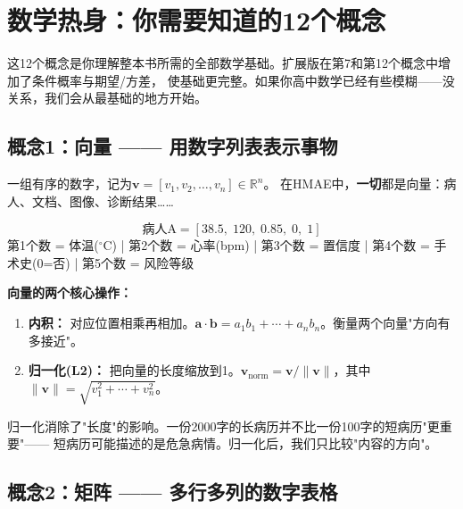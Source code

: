 \documentclass[11pt,a4paper]{ctexart}
\begin{document}
\section{数学热身：你需要知道的12个概念}

\begin{warnbox}[别怕！每个公式旁边都有中文解释]
这12个概念是你理解整本书所需的全部数学基础。扩展版在第7和第12个概念中增加了条件概率与期望/方差，
使基础更完整。如果你高中数学已经有些模糊——没关系，我们会从最基础的地方开始。
\end{warnbox}

\subsection{概念1：向量 —— 用数字列表表示事物}

\begin{defbox}[向量 (Vector)]
一组有序的数字，记为$\mathbf{v} = [v_1, v_2, \ldots, v_n] \in \mathbb{R}^n$。
在HMAE中，\textbf{一切}都是向量：病人、文档、图像、诊断结果……
\end{defbox}

\begin{exambox}[例子：用向量表示一个病人]
$$
\text{病人A} = [38.5,\; 120,\; 0.85,\; 0,\; 1]
$$
第1个数 = 体温($^\circ$C) | 第2个数 = 心率(bpm) | 第3个数 = 置信度 | 第4个数 = 手术史(0=否) | 第5个数 = 风险等级
\end{exambox}

\textbf{向量的两个核心操作：}
\begin{enumerate}[nosep]
\item \textbf{内积：} 对应位置相乘再相加。$\mathbf{a} \cdot \mathbf{b} = a_1b_1 + \cdots + a_nb_n$。衡量两个向量"方向有多接近"。
\item \textbf{归一化(L2)：} 把向量的长度缩放到1。$\mathbf{v}_{\text{norm}} = \mathbf{v} / \|\mathbf{v}\|$，其中$\|\mathbf{v}\| = \sqrt{v_1^2 + \cdots + v_n^2}$。
\end{enumerate}

\begin{keybox}[关键洞察：方向 vs 长度]
归一化消除了"长度"的影响。一份2000字的长病历并不比一份100字的短病历"更重要"——
短病历可能描述的是危急病情。归一化后，我们只比较"内容的方向"。
\end{keybox}

\subsection{概念2：矩阵 —— 多行多列的数字表格}
\end{document}
